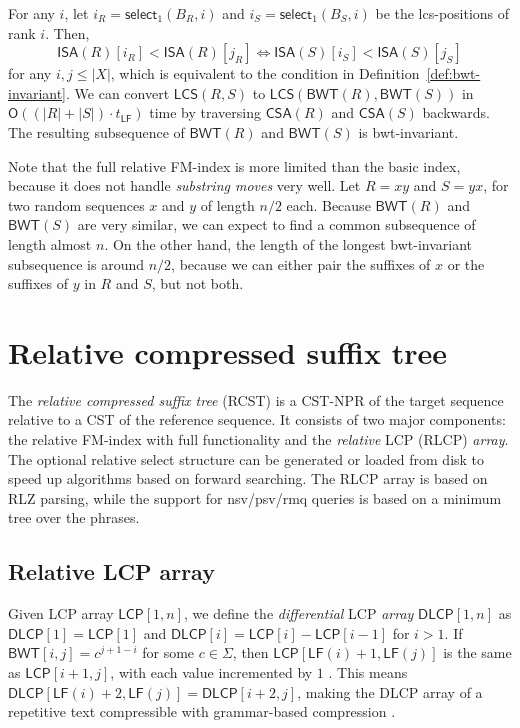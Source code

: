 \documentclass[a4paper,11pt]{llncs}
\newcommand{\abs}[1]{\ensuremath{\lvert #1 \rvert}}
\newcommand{\CST}{\textsf{CST}}
\newcommand{\CSTnpr}{\textsf{CST\nobreakdash-NPR}}
\newcommand{\RCST}{\textsf{RCST}}
\newcommand{\mISA}{\ensuremath{\mathsf{ISA}}}
\newcommand{\mBWT}{\ensuremath{\mathsf{BWT}}}
\newcommand{\mCSA}{\ensuremath{\mathsf{CSA}}}
\newcommand{\LCP}{\textsf{LCP}}
\newcommand{\DLCP}{\textsf{DLCP}}
\newcommand{\RLCP}{\textsf{RLCP}}
\newcommand{\mLCP}{\ensuremath{\mathsf{LCP}}}
\newcommand{\mDLCP}{\ensuremath{\mathsf{DLCP}}}
\newcommand{\RLZ}{\textsf{RLZ}}
\newcommand{\mLCS}{\ensuremath{\mathsf{LCS}}}
\newcommand{\nsv}{\textsf{nsv}}
\newcommand{\psv}{\textsf{psv}}
\newcommand{\rmq}{\textsf{rmq}}
\newcommand{\mLF}{\ensuremath{\mathsf{LF}}}
\newcommand{\mselect}{\ensuremath{\mathsf{select}}}
\newcommand{\Oh}{\ensuremath{\mathsf{O}}}
\begin{document}
For any $i$, let $i_{R} = \mselect_{1}(B_{R}, i)$ and $i_{S} = \mselect_{1}(B_{S}, i)$ be the lcs-positions of rank $i$. Then,
$$
\mISA(R)[i_{R}] < \mISA(R)[j_{R}] \iff \mISA(S)[i_{S}] < \mISA(S)[j_{S}]
$$
for any $i,j \le \abs{X}$, which is equivalent to the condition in Definition~\ref{def:bwt-invariant}. We can convert $\mLCS(R,S)$ to $\mLCS(\mBWT(R),\mBWT(S))$ in $\Oh((\abs{R}+\abs{S}) \cdot t_{\mLF})$ time by traversing $\mCSA(R)$ and $\mCSA(S)$ backwards. The resulting subsequence of $\mBWT(R)$ and $\mBWT(S)$ is bwt-invariant.

Note that the full relative FM-index is more limited than the basic index, because it does not handle \emph{substring moves} very well. Let $R = xy$ and $S = yx$, for two random sequences $x$ and $y$ of length $n/2$ each. Because $\mBWT(R)$ and $\mBWT(S)$ are very similar, we can expect to find a common subsequence of length almost $n$. On the other hand, the length of the longest bwt-invariant subsequence is around $n/2$, because we can either pair the suffixes of $x$ or the suffixes of $y$ in $R$ and $S$, but not both.


\section{Relative compressed suffix tree}

The \emph{relative compressed suffix tree} (\RCST) is a \CSTnpr{} of the target sequence relative to a \CST{} of the reference sequence. It consists of two major components: the relative FM-index with full functionality and the \emph{relative} \LCP{} (\RLCP) \emph{array}. The optional relative select structure can be generated or loaded from disk to speed up algorithms based on forward searching. The \RLCP{} array is based on \RLZ{} parsing, while the support for \nsv/\psv/\rmq{} queries is based on a minimum tree over the phrases.

\subsection{Relative \LCP{} array}

Given \LCP{} array $\mLCP[1,n]$, we define the \emph{differential} \LCP{} \emph{array} $\mDLCP[1,n]$ as $\mDLCP[1] = \mLCP[1]$ and $\mDLCP[i] = \mLCP[i] - \mLCP[i-1]$ for $i > 1$. If $\mBWT[i,j] = c^{j+1-i}$ for some $c \in \Sigma$, then $\mLCP[\mLF(i)+1,\mLF(j)]$ is the same as $\mLCP[i+1,j]$, with each value incremented by $1$ \cite{Fischer2009a}. This means $\mDLCP[\mLF(i)+2,\mLF(j)] = \mDLCP[i+2,j]$, making the \DLCP{} array of a repetitive text compressible with grammar-based compression \cite{Abeliuk2013}.
\end{document}
